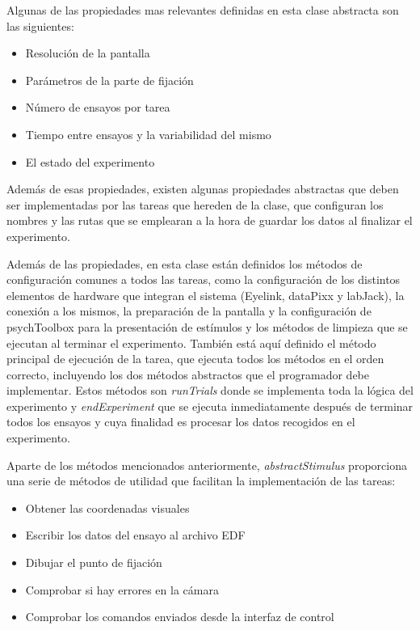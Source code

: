 \documentclass[conference]{IEEEtran}
\begin{document}
Algunas de las propiedades mas relevantes definidas en esta clase abstracta son las siguientes:

\begin{itemize}

	\item Resolución de la pantalla
	\item Parámetros de la parte de fijación
	\item Número de ensayos por tarea
	\item Tiempo entre ensayos y la variabilidad del mismo
	\item El estado del experimento

\end{itemize}

Además de esas propiedades, existen algunas propiedades abstractas que deben ser implementadas por las tareas que hereden de la clase, que configuran los nombres y las rutas que se emplearan a la hora de guardar los datos al finalizar el experimento.

Además de las propiedades, en esta clase están definidos los métodos de configuración comunes a todos las tareas, como la configuración de los distintos elementos de hardware que integran el sistema (Eyelink, dataPixx y labJack), la conexión a los mismos, la preparación de la pantalla y la configuración de psychToolbox para la presentación de estímulos y los métodos de limpieza que se ejecutan al terminar el experimento. También está aquí definido el método principal de ejecución de la tarea, que ejecuta todos los métodos en el orden correcto, incluyendo los dos métodos abstractos que el programador debe implementar. Estos métodos son \textit{runTrials} donde se implementa toda la lógica del experimento y \textit{endExperiment} que se ejecuta inmediatamente después de terminar todos los ensayos y cuya finalidad es procesar los datos recogidos en el experimento.

Aparte de los métodos mencionados anteriormente, \textit{abstractStimulus} proporciona una serie de métodos de utilidad que facilitan la implementación de las tareas:

\begin{itemize}
	\item Obtener las coordenadas visuales
	\item Escribir los datos del ensayo al archivo EDF
	\item Dibujar el punto de fijación
	\item Comprobar si hay errores en la cámara
	\item Comprobar los comandos enviados desde la interfaz de control
\end{itemize}
\end{document}
